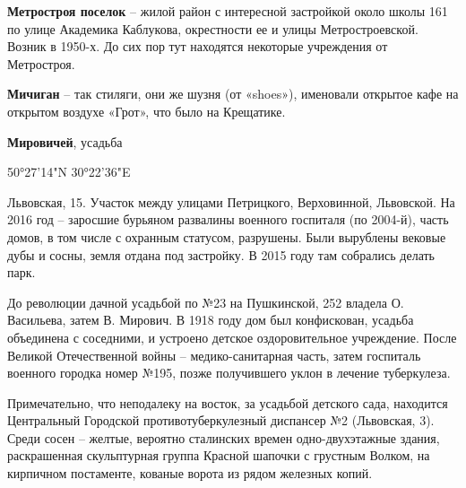 \textbf{Метростроя поселок} – жилой район с интересной застройкой около школы 161 по улице Академика Каблукова, окрестности ее и улицы Метростроевской. Возник в 1950-х. До сих пор тут находятся некоторые учреждения от Метростроя.\\

\medskip

\textbf{Мичиган} – так стиляги, они же шузня (от «shoes»), именовали открытое кафе на открытом воздухе «Грот», что было на Крещатике.\\

\medskip

\textbf{Мировичей}, усадьба

50°27'14"N 30°22'36"E

Львовская, 15. Участок между улицами Петрицкого, Верховинной, Львовской. На 2016 год – заросшие бурьяном развалины военного госпиталя (по 2004-й), часть домов, в том числе с охранным статусом, разрушены. Были вырублены вековые дубы и сосны, земля отдана под застройку. В 2015 году там собрались делать парк.

До революции дачной усадьбой по №23 на Пушкинской, 252 владела О. Васильева, затем В. Мирович. В 1918 году дом был конфискован, усадьба объединена с соседними, и устроено детское оздоровительное учреждение. После Великой Отечественной войны – медико-санитарная часть, затем госпиталь военного городка номер №195, позже получившего уклон в лечение туберкулеза.

Примечательно, что неподалеку на восток, за усадьбой детского сада, находится Центральный Городской противотуберкулезный диспансер №2 (Львовская, 3). Среди сосен – желтые, вероятно сталинских времен одно-двухэтажные здания, раскрашенная скульптурная группа Красной шапочки с грустным Волком, на кирпичном постаменте, кованые ворота из рядом железных копий.\\

\medskip


